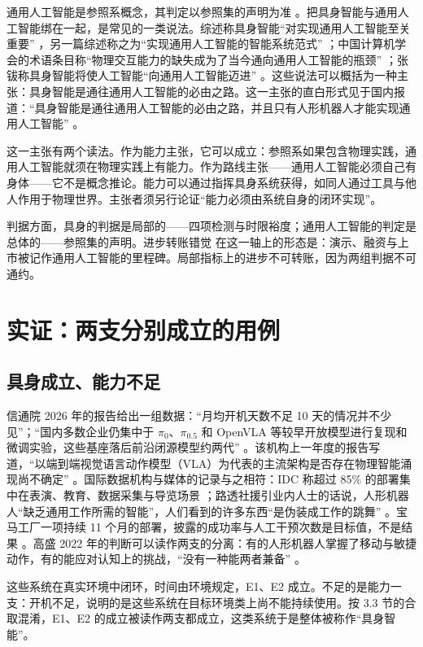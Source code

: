\documentclass[10pt,fontset=fandol]{ctexart}
\begin{document}
通用人工智能是参照系概念，其判定以参照集的声明为准 \cite{yu2026four}。把具身智能与通用人工智能绑在一起，是常见的一类说法。综述称具身智能“对实现通用人工智能至关重要” \cite{liu2024survey}，另一篇综述称之为“实现通用人工智能的智能系统范式” \cite{feng2025}；中国计算机学会的术语条目称“物理交互能力的缺失成为了当今通向通用人工智能的瓶颈” \cite{ccf2023}；张钹称具身智能将使人工智能“向通用人工智能迈进” \cite{zhangbo2025}。这些说法可以概括为一种主张：具身智能是通往通用人工智能的必由之路。这一主张的直白形式见于国内报道：“具身智能是通往通用人工智能的必由之路，并且只有人形机器人才能实现通用人工智能” \cite{jiemian2024}。

这一主张有两个读法。作为能力主张，它可以成立：参照系如果包含物理实践，通用人工智能就须在物理实践上有能力。作为路线主张——通用人工智能必须自己有身体——它不是概念推论。能力可以通过指挥具身系统获得，如同人通过工具与他人作用于物理世界。主张者须另行论证“能力必须由系统自身的闭环实现”。

判据方面，具身的判据是局部的——四项检测与时限裕度；通用人工智能的判定是总体的——参照集的声明。进步转账错觉 \cite{yu2026two} 在这一轴上的形态是：演示、融资与上市被记作通用人工智能的里程碑。局部指标上的进步不可转账，因为两组判据不可通约。

\section{实证：两支分别成立的用例}\label{sec:s6}

\subsection{具身成立、能力不足}

信通院 2026 年的报告给出一组数据：“月均开机天数不足 10 天的情况并不少见”；“国内多数企业仍集中于 $\pi_0$、$\pi_{0.5}$ 和 OpenVLA 等较早开放模型进行复现和微调实验，这些基座落后前沿闭源模型约两代” \cite{caict2026}。该机构上一年度的报告写道，“以端到端视觉语言动作模型（VLA）为代表的主流架构是否存在物理智能涌现尚不确定” \cite{caict2025}。国际数据机构与媒体的记录与之相符：IDC 称超过 85\% 的部署集中在表演、教育、数据采集与导览场景 \cite{idc2026}；路透社援引业内人士的话说，人形机器人“缺乏通用工作所需的智能”，人们看到的许多东西“是伪装成工作的跳舞” \cite{reuters2026}。宝马工厂一项持续 11 个月的部署，披露的成功率与人工干预次数是目标值，不是结果 \cite{figure_bmw}。高盛 2022 年的判断可以读作两支的分离：有的人形机器人掌握了移动与敏捷动作，有的能应对认知上的挑战，“没有一种能两者兼备” \cite{goldman2022}。

这些系统在真实环境中闭环，时间由环境规定，E1、E2 成立。不足的是能力一支：开机不足，说明的是这些系统在目标环境类上尚不能持续使用。按 3.3 节的合取混淆，E1、E2 的成立被读作两支都成立，这类系统于是整体被称作“具身智能”。
\end{document}
